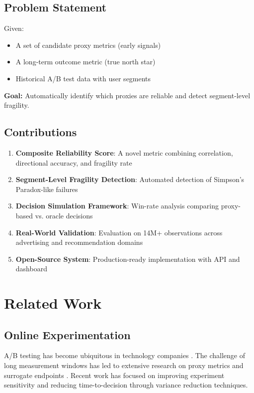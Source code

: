 \documentclass[11pt,twocolumn]{article}
\begin{document}
\subsection{Problem Statement}

Given:
\begin{itemize}
    \item A set of candidate proxy metrics (early signals)
    \item A long-term outcome metric (true north star)
    \item Historical A/B test data with user segments
\end{itemize}

\textbf{Goal:} Automatically identify which proxies are reliable and detect segment-level fragility.

\subsection{Contributions}

\begin{enumerate}
    \item \textbf{Composite Reliability Score}: A novel metric combining correlation, directional accuracy, and fragility rate
    \item \textbf{Segment-Level Fragility Detection}: Automated detection of Simpson's Paradox-like failures
    \item \textbf{Decision Simulation Framework}: Win-rate analysis comparing proxy-based vs. oracle decisions
    \item \textbf{Real-World Validation}: Evaluation on 14M+ observations across advertising and recommendation domains
    \item \textbf{Open-Source System}: Production-ready implementation with API and dashboard
\end{enumerate}

\section{Related Work}

\subsection{Online Experimentation}

A/B testing has become ubiquitous in technology companies \cite{kohavi2009controlled,kohavi2013online}. The challenge of long measurement windows has led to extensive research on proxy metrics and surrogate endpoints \cite{deng2016continuous}. Recent work has focused on improving experiment sensitivity \cite{deng2013improving} and reducing time-to-decision through variance reduction techniques.
\end{document}
